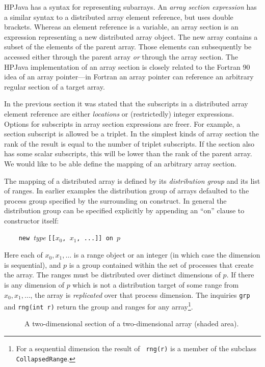 \documentclass{article}
\begin{document}
HPJava has a syntax for representing subarrays.  An {\em array
section expression} has a similar syntax to a distributed array element
reference, but uses double brackets.  Whereas an element reference is a
variable, an array section is an expression representing a new
distributed array object.  The new array contains a subset of the
elements of the parent array.  Those elements can subsequently be
accessed either through the parent array {\em or} through the array
section.  The HPJava implementation of an array section is closely
related to the Fortran 90 idea of an array pointer---in Fortran an
array pointer can reference an arbitrary regular section of a target
array.

In the previous section it was stated that the subscripts in a
distributed array element reference are either {\em locations} or
(restrictedly) integer expressions.  Options for subscripts in array
section expressions are freer.  For example, a
section subscript is allowed be a triplet.
In the simplest kinds of array section
the rank of the result is equal to the number of triplet
subscripts.  If the section also has some scalar subscripts,
this will be lower than the rank of the parent array.
We would like to be able define the mapping of an arbitrary array
section.

The mapping of a distributed array is defined
by its {\em distribution group} and its list of ranges.
In earlier examples the distribution group of arrays defaulted to the
process group specified by the surrounding on construct.
In general the distribution group can be specified explicitly
by appending an ``on'' clause to constructor itself:
\small
\begin{tabbing}
\verb$    new ${\em type }\verb$[[$$x_0$\verb$, $$x_1$\verb$, ...]] on $$p$
\end{tabbing}
\normalsize
Here each of $x_0, x_1, \ldots$ is a range object or an integer
(in which case the dimension is sequential), and $p$ is a group
contained within the set of processes that create the array.
The ranges must be distributed over distinct dimensions of $p$.
If there is any dimension of $p$ which is not a distribution target
of some range from $x_0, x_1, \ldots$, the array is {\em replicated}
over that process dimension.
The inquiries {\tt grp} and {\tt rng(int r)} return the group and ranges
for any array\footnote{For a sequential dimension the result of {\tt
rng(r)} is a member of the subclass {\tt CollapsedRange}.}.

\begin{figure*}[tbp]
\centerline{}
\caption{A two-dimensional section of a two-dimensional array
(shaded area).\label{fig:section2}}
\end{figure*}
\end{document}
